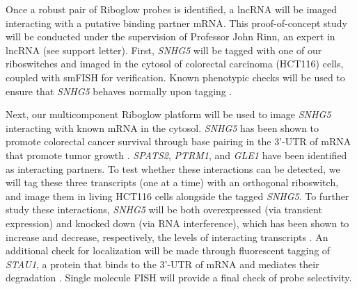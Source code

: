 Once a robust pair of Riboglow probes is identified, a lncRNA will be imaged interacting with a putative binding partner mRNA. This proof-of-concept study will be conducted under the supervision of Professor John Rinn, an expert in lncRNA (see support letter).
First, \textit{SNHG5} will be tagged with one of our riboswitches and imaged in the cytosol of colorectal carcinoma (HCT116) cells, coupled with smFISH for verification.
Known phenotypic checks will be used to ensure that \textit{SNHG5} behaves normally upon tagging \cite{DamasSNHG5promotescolorectal2016}.  %

Next, our multicomponent Riboglow platform will be used to image \textit{SNHG5} interacting with known mRNA in the cytosol. \textit{SNHG5} has been shown to promote colorectal cancer survival through base pairing in the 3'-UTR of mRNA that promote tumor growth \cite{DamasSNHG5promotescolorectal2016}.
\textit{SPATS2}, \textit{PTRM1}, and \textit{GLE1} have been identified as interacting partners. To test whether these interactions can be detected, we will tag these three transcripts (one at a time) with an orthogonal riboswitch, and image them in living HCT116 cells alongside the tagged \textit{SNHG5}.
To further study these interactions, \textit{SNHG5} will be both overexpressed (via transient expression) and knocked down (via RNA interference), which has been shown to increase and decrease, respectively, the levels of interacting transcripts \cite{DamasSNHG5promotescolorectal2016}.
An additional check for localization will be made through fluorescent tagging of \textit{STAU1}, a protein that binds to the 3'-UTR of mRNA and mediates their degradation \cite{ParkEonyoungStaufenmediatedmRNA2013}. Single molecule FISH will provide a final check of probe selectivity.

